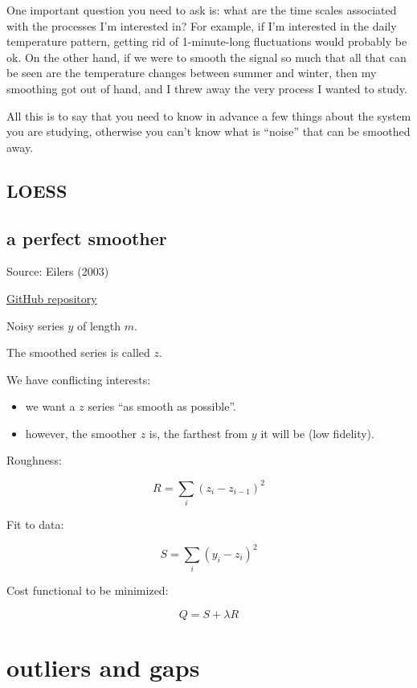 \documentclass[
  letterpaper,
  DIV=11,
  numbers=noendperiod,
  oneside]{scrreprt}
\providecommand{\tightlist}{%
  \setlength{\itemsep}{0pt}\setlength{\parskip}{0pt}}\usepackage{longtable,booktabs,array}
\begin{document}
One important question you need to ask is: what are the time scales
associated with the processes I'm interested in? For example, if I'm
interested in the daily temperature pattern, getting rid of
1-minute-long fluctuations would probably be ok. On the other hand, if
we were to smooth the signal so much that all that can be seen are the
temperature changes between summer and winter, then my smoothing got out
of hand, and I threw away the very process I wanted to study.

All this is to say that you need to know in advance a few things about
the system you are studying, otherwise you can't know what is ``noise''
that can be smoothed away.

\hypertarget{loess}{%
\chapter{LOESS}\label{loess}}

\hypertarget{a-perfect-smoother}{%
\chapter{a perfect smoother}\label{a-perfect-smoother}}

Source: Eilers (2003)

\href{https://github.com/mhvwerts/whittaker-eilers-smoother/tree/master}{GitHub
repository}

Noisy series \(y\) of length \(m\).

The smoothed series is called \(z\).

We have conflicting interests:

\begin{itemize}
\tightlist
\item
  we want a \(z\) series ``as smooth as possible''.
\item
  however, the smoother \(z\) is, the farthest from \(y\) it will be
  (low fidelity).
\end{itemize}

Roughness:

\[
R = \displaystyle\sum_i (z_i - z_{i-1})^2
\]

Fit to data:

\[
S = \displaystyle\sum_i (y_i - z_i)^2
\]

Cost functional to be minimized:

\[
Q = S + \lambda R
\]

\part{outliers and gaps}
\end{document}
